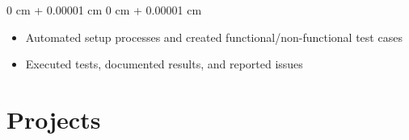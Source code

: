 \documentclass[10pt, letterpaper]{article}
\newenvironment{highlights}{
    \begin{itemize}[
        topsep=0.10 cm,
        parsep=0.10 cm,
        partopsep=0pt,
        itemsep=0pt,
        leftmargin=0 cm + 10pt
    ]
}{
    \end{itemize}
} %
\newenvironment{onecolentry}{
    \begin{adjustwidth}{
        0 cm + 0.00001 cm
    }{
        0 cm + 0.00001 cm
    }
}{
    \end{adjustwidth}
} %
\begin{document}
\begin{onecolentry}
    \begin{highlights}
        \setlength\itemsep{0pt}
        \setlength\parsep{0pt}
    \item Automated setup processes and created functional/non-functional test cases
\item Executed tests, documented results, and reported issues
    \end{highlights}
\end{onecolentry}

\vspace{0.1cm}

    \vspace{-0.35cm}
\section{Projects}
\end{document}
